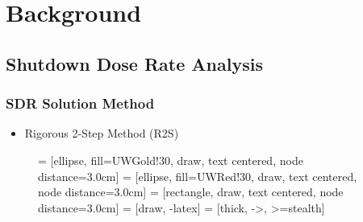 \documentclass{beamer}
\begin{document}
\section{Background}
\subsection{Shutdown Dose Rate Analysis}
\begin{frame}
\frametitle{SDR Solution Method}

%
%        
%
\begin{itemize}
	\item{Rigorous 2-Step Method (R2S) \cite{r2s}}
\end{itemize}
	\vspace{0.3cm}

	\begin{figure}
        \centering
         = [ellipse, fill=UWGold!30, draw, text centered,
		node distance=3.0cm]
         = [ellipse, fill=UWRed!30, draw, text centered, node
		distance=3.0cm]
         = [rectangle, draw, text centered, node distance=3.0cm]
         = [draw, -latex]
         = [thick, ->, >=stealth]
        

\end{figure}
\end{frame}
\end{document}
